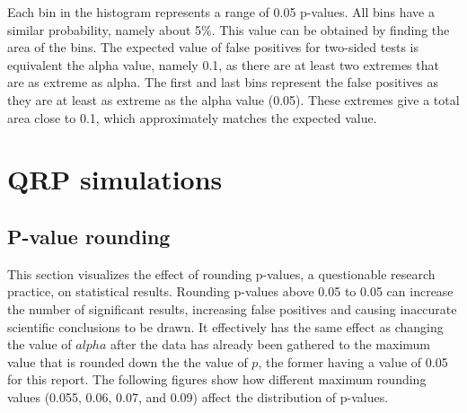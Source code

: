 \documentclass[12pt]{article}
\begin{document}
    Each bin in the histogram represents a range of 0.05 p-values. All bins have a similar probability, namely about 5\%. This value can be obtained by finding the area of the bins. The expected value of false positives for two-sided tests is equivalent the alpha value, namely 0.1, as there are at least two extremes that are as extreme as alpha. The first and last bins represent the false positives as they are at least as extreme as the alpha value (0.05). These extremes give a total area close to 0.1, which approximately matches the expected value.

\section{QRP simulations}
\subsection{P-value rounding}
    This section visualizes the effect of rounding p-values, a questionable research practice, on statistical results. Rounding p-values above 0.05 to 0.05 can increase the number of significant results, increasing false positives and causing inaccurate scientific conclusions to be drawn. It effectively has the same effect as changing the value of $alpha$ after the data has already been gathered to the maximum value that is rounded down the the value of $p$, the former having a value of 0.05 for this report. The following figures show how different maximum rounding values (0.055, 0.06, 0.07, and 0.09) affect the distribution of p-values.
\end{document}
